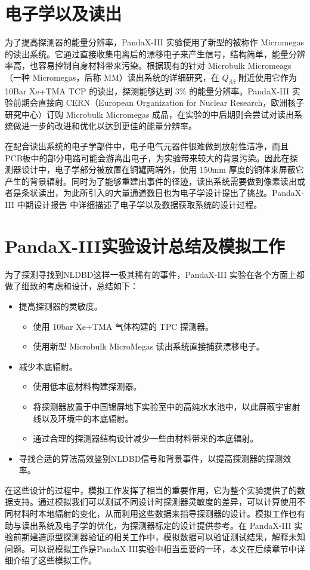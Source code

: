 \section{电子学以及读出}

为了提高探测器的能量分辨率，PandaX-III 实验使用了新型的被称作 Micromegas 的读出系统。它通过直接收集电离后的漂移电子来产生信号，结构简单，能量分辨率高，也容易控制自身材料带来污染。根据现有的针对 Microbulk Micromeags（一种 Micromegas，后称 MM）读出系统的详细研究，在 $Q_{\beta\beta}$ 附近使用它作为 10Bar Xe+TMA TCP 的读出，探测能够达到 3\% 的能量分辨率。PandaX-III 实验前期会直接向 CERN（European Organization for Nuclear Research，欧洲核子研究中心）订购 Microbulk Micromegas 成品，在实验的中后期则会尝试对读出系统做进一步的改进和优化以达到更佳的能量分辨率\supercite{cdr}。

在配合读出系统的电子学部件中，电子电气元器件很难做到放射性洁净，而且PCB板中的部分电路可能会游离出电子，为实验带来较大的背景污染。因此在探测器设计中，电子学部分被放置在铜罐两端外，使用 150mm 厚度的铜体来屏蔽它产生的背景辐射。同时为了能够重建出事件的径迹，读出系统需要做到像素读出或者是条状读出，为此所引入的大量通道数目也为电子学设计提出了挑战。PandaX-III 中期设计报告\supercite{cdr} 中详细描述了电子学以及数据获取系统的设计过程。

\section{PandaX-III实验设计总结及模拟工作}

为了探测寻找到NLDBD这样一极其稀有的事件，PandaX-III 实验在各个方面上都做了细致的考虑和设计，总结如下：

\vspace{0.4cm}

\begin{itemize}
    \item 提高探测器的灵敏度。
    \begin{itemize}
        \item 使用 10bar Xe+TMA 气体构建的 TPC 探测器。
        \item 使用新型 Microbulk MicroMegas 读出系统直接捕获漂移电子。
    \end{itemize}
    \item 减少本底辐射。
    \begin{itemize}
        \item 使用低本底材料构建探测器。
        \item 将探测器放置于中国锦屏地下实验室中的高纯水水池中，以此屏蔽宇宙射线以及环境中的本底辐射。
        \item 通过合理的探测器结构设计减少一些由材料带来的本底辐射。
    \end{itemize}
    \item 寻找合适的算法高效鉴别NLDBD信号和背景事件，以提高探测器的探测效率。
\end{itemize}

\vspace{0.4cm}

在这些设计的过程中，模拟工作发挥了相当的重要作用，它为整个实验提供了的数据支持。通过模拟我们可以测试不同设计时探测器灵敏度的差异，可以计算使用不同材料时本地辐射的变化，从而利用这些数据来指导探测器的设计。模拟工作也有助与读出系统及电子学的优化，为探测器标定的设计提供参考。在 PandaX-III 实验前期建造原型探测器验证的相关工作中，模拟数据可以验证测试结果，解释未知问题。可以说模拟工作是PandaX-III实验中相当重要的一环，本文在后续章节中详细介绍了这些模拟工作。

